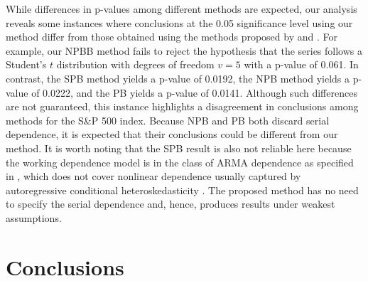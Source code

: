 \documentclass[APA,Times1COL]{WileyNJDv5} %
\newcommand{\jy}[1]{\textcolor{blue}{JY: (#1)}}
\newcommand{\eds}[1]{\textcolor{red}{EDS: (#1)}}
\begin{document}
While differences in p-values among different methods are expected, our analysis
reveals some instances where conclusions at the 0.05 significance level
using our method differ from those obtained using the methods proposed by
\citet{babu2004goodness} and \citet{zeimbekakis2022misuses}.
For example, our NPBB method fails to reject the
hypothesis that the series follows a Student's $t$ distribution with degrees of
freedom $v = 5$ with a p-value of 0.061. In contrast, 
the SPB method yields a p-value of 0.0192,
the NPB method yields a p-value of 0.0222, and the PB yields a p-value of
0.0141. Although such differences are not guaranteed, this
instance highlights a disagreement in conclusions among methods for the S\&P 500
index. Because NPB and PB both discard serial dependence, it is expected that
their conclusions could be different from our method. It is worth noting that
the SPB result is also not reliable here because the working dependence model is
in the class of ARMA dependence as specified in \citet{zeimbekakis2022misuses},
which does not cover nonlinear dependence usually captured by autoregressive
conditional heteroskedasticity \citep{engle1995arch}. The proposed method has
no need to specify the serial dependence and, hence, produces results under
weakest assumptions.


\section{Conclusions}\label{sec:conclusion}
\end{document}
